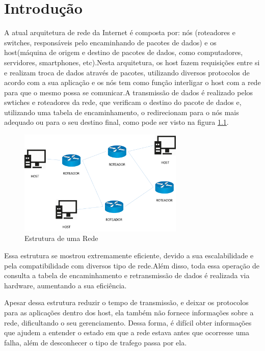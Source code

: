 



\chapter{Introdução}

A atual arquitetura de rede da Internet é composta por: nós (roteadores e switches, responsáveis pelo encaminhando de pacotes de dados) e os host(máquina de origem e destino de pacotes de dados, como computadores, servidores, smartphones, etc).Nesta arquitetura, os host fazem requisições entre si e realizam  troca de dados através de pacotes, utilizando diversos protocolos de acordo com a sua aplicação e os nós tem como função interligar o host com a rede para que o mesmo possa se comunicar.A transmissão de dados  é realizado pelos swtiches e roteadores da rede, que verificam o destino do pacote de dados e, utilizando uma tabela de encaminhamento, o redirecionam para o nós mais adequado ou para o seu destino final, como pode ser visto na figura \ref{Fig_Rede}.
\begin{figure}[h]
\centering
\includegraphics[width=0.7\textwidth]{Introducao/Rede.png}
\caption{Estrutura de uma Rede}
\label{Fig_Rede}
\end{figure}

Essa estrutura se mostrou extremamente eficiente, devido a sua escalabilidade e pela compatibilidade com diversos tipo de rede.Além disso, toda essa operação de consulta a tabela de encaminhamento e retransmissão de dados é realizada via hardware, aumentando a sua eficiência.

Apesar dessa estrutura reduzir o tempo de transmissão, e deixar os protocolos para as aplicações dentro dos host, ela também não fornece informações sobre a rede, dificultando o seu gerenciamento. Dessa forma, é difícil obter informações que ajudem a entender o estado em que a rede estava antes que ocorresse uma falha, além de desconhecer o tipo de trafego passa por ela.

